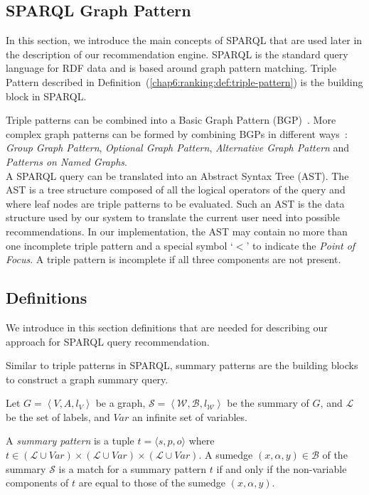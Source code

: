\subsection{SPARQL Graph Pattern}

In this section, we introduce the main concepts of SPARQL that are used later in the description of our recommendation engine. SPARQL is the standard query language for RDF data and is based around graph pattern matching. Triple Pattern described in Definition~(\ref{chap6:ranking:def:triple-pattern}) is the building block in SPARQL.

Triple patterns can be combined into a Basic Graph Pattern (BGP)~\cite{PrudS08}. More complex graph patterns can be formed by combining BGPs in different ways~\cite{PrudS08}: \emph{Group Graph Pattern}, \emph{Optional Graph Pattern}, \emph{Alternative Graph Pattern} and \emph{Patterns on Named Graphs}.\\

A SPARQL query can be translated into an Abstract Syntax Tree (AST). The AST is a tree structure composed of all the logical operators of the query and where leaf nodes are triple patterns to be evaluated. Such an AST is the data structure used by our system to translate the current user need into possible recommendations. In our implementation, the AST may contain no more than one incomplete triple pattern and a special symbol `$<$' to indicate the \emph{Point of Focus}. A triple pattern is incomplete if all three components are not present.

\subsection{Definitions}

We introduce in this section definitions that are needed for describing our approach for SPARQL query recommendation.

Similar to triple patterns in SPARQL, summary patterns are the building blocks to construct a graph summary query.

\begin{definition}
	Let $G=\left\langle V, A, l_V \right\rangle$ be a graph, $\mathcal{S} = \left\langle \mathcal{W}, \mathcal{B}, l_{\mathcal{W}} \right\rangle$ be the summary of $G$, and $\mathcal{L}$ be the set of labels, and $Var$ an infinite set of variables.

	A \emph{summary pattern} is a tuple $t = \langle s, p, o \rangle$ where $t \in (\mathcal{L} \cup Var) \times (\mathcal{L} \cup Var) \times (\mathcal{L} \cup Var)$.
	A sumedge $(x,\alpha,y) \in \mathcal{B}$ of the summary $\mathcal{S}$ is a match for a summary pattern $t$ if and only if the non-variable components of $t$ are equal to those of the sumedge $(x, \alpha, y)$.
	\label{chap4:summary:def:summary-triple-pattern}
\end{definition}

